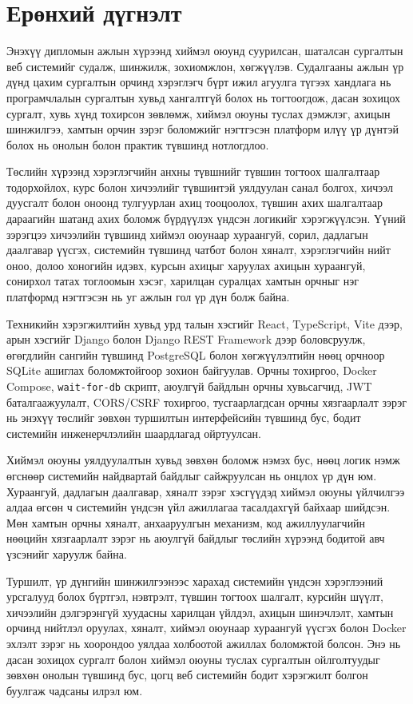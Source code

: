 
{}
\label{Summary}

\section*{Ерөнхий дүгнэлт}
Энэхүү дипломын ажлын хүрээнд хиймэл оюунд суурилсан, шаталсан сургалтын веб системийг судалж, шинжилж, зохиомжлон, хөгжүүлэв. Судалгааны ажлын үр дүнд цахим сургалтын орчинд хэрэглэгч бүрт ижил агуулга түгээх хандлага нь програмчлалын сургалтын хувьд хангалтгүй болох нь тогтоогдож, дасан зохицох сургалт, хувь хүнд тохирсон зөвлөмж, хиймэл оюуны туслах дэмжлэг, ахицын шинжилгээ, хамтын орчин зэрэг боломжийг нэгтгэсэн платформ илүү үр дүнтэй болох нь онолын болон практик түвшинд нотлогдлоо.

Төслийн хүрээнд хэрэглэгчийн анхны түвшнийг түвшин тогтоох шалгалтаар тодорхойлох, курс болон хичээлийг түвшинтэй уялдуулан санал болгох, хичээл дуусгалт болон оноонд тулгуурлан ахиц тооцоолох, түвшин ахих шалгалтаар дараагийн шатанд ахих боломж бүрдүүлэх үндсэн логикийг хэрэгжүүлсэн. Үүний зэрэгцээ хичээлийн түвшинд хиймэл оюунаар хураангуй, сорил, дадлагын даалгавар үүсгэх, системийн түвшинд чатбот болон хяналт, хэрэглэгчийн нийт оноо, долоо хоногийн идэвх, курсын ахицыг харуулах ахицын хураангуй, сонирхол татах тоглоомын хэсэг, харилцан суралцах хамтын орчныг нэг платформд нэгтгэсэн нь уг ажлын гол үр дүн болж байна.

Техникийн хэрэгжилтийн хувьд урд талын хэсгийг React, TypeScript, Vite дээр, арын хэсгийг Django болон Django REST Framework дээр боловсруулж, өгөгдлийн сангийн түвшинд PostgreSQL болон хөгжүүлэлтийн нөөц орчноор SQLite ашиглах боломжтойгоор зохион байгуулав. Орчны тохиргоо, Docker Compose, \texttt{wait-for-db} скрипт, аюулгүй байдлын орчны хувьсагчид, JWT баталгаажуулалт, CORS/CSRF тохиргоо, тусгаарлагдсан орчны хязгаарлалт зэрэг нь энэхүү төслийг зөвхөн туршилтын интерфейсийн түвшинд бус, бодит системийн инженерчлэлийн шаардлагад ойртуулсан.

Хиймэл оюуны уялдуулалтын хувьд зөвхөн боломж нэмэх бус, нөөц логик нэмж өгснөөр системийн найдвартай байдлыг сайжруулсан нь онцлох үр дүн юм. Хураангуй, дадлагын даалгавар, хяналт зэрэг хэсгүүдэд хиймэл оюуны үйлчилгээ алдаа өгсөн ч системийн үндсэн үйл ажиллагаа тасалдахгүй байхаар шийдсэн. Мөн хамтын орчны хяналт, анхааруулгын механизм, код ажиллуулагчийн нөөцийн хязгаарлалт зэрэг нь аюулгүй байдлыг төслийн хүрээнд бодитой авч үзсэнийг харуулж байна.

Туршилт, үр дүнгийн шинжилгээнээс харахад системийн үндсэн хэрэглээний урсгалууд болох бүртгэл, нэвтрэлт, түвшин тогтоох шалгалт, курсийн шүүлт, хичээлийн дэлгэрэнгүй хуудасны харилцан үйлдэл, ахицын шинэчлэлт, хамтын орчинд нийтлэл оруулах, хяналт, хиймэл оюунаар хураангуй үүсгэх болон Docker эхлэлт зэрэг нь хоорондоо уялдаа холбоотой ажиллах боломжтой болсон. Энэ нь дасан зохицох сургалт болон хиймэл оюуны туслах сургалтын ойлголтуудыг зөвхөн онолын түвшинд бус, цогц веб системийн бодит хэрэгжилт болгон буулгаж чадсаны илрэл юм.

